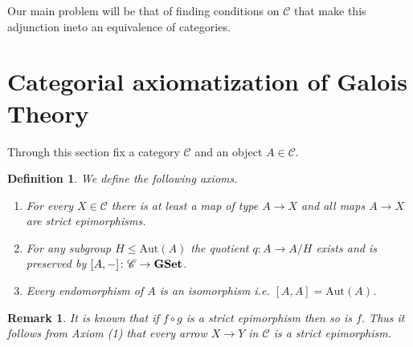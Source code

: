 \documentclass[italian, 12pt, reqno]{article}
\theoremstyle{myteo}
\newtheorem{definition}[theorem]{Definition}
\newtheorem{remark}[theorem]{Remark}
\numberwithin{equation}{section}
\newcommand{\cat}[1]{\mathscr{#1}}
\newcommand{\aut}{\text{Aut}}
\newcommand{\gset}{\text{\textbf{GSet}}}
\newcommand{\homs}[2]{[#1, #2]}
\newcommand{\fun}[3]{#1\colon#2\to #3}
\begin{document}
\begin{figure}[h]
  \begin{center}
    \hspace{2cm}
  \end{center}
  \caption{}
  \label{diagram:bijection}
\end{figure}

Our main problem will be that of finding conditions on \(\cat{C}\) that make this adjunction ineto an equivalence of categories.

\section{Categorial axiomatization of Galois Theory}
\label{sec:axioms}

Through this section fix a category \(\cat{C}\) and an object \(A\in\cat{C}\).

\begin{definition}
  \label{def:axioms}
  We define the following axioms.
  \begin{enumerate}
  \item For every \(X\in\cat{C}\) there is at least a map of type \(A\to X\) and all maps \(A\to X\) are strict epimorphisms.
  \item For any subgroup \(H\leq \aut(A)\) the quotient \(\fun{q}{A}{A/H}\) exists and is preserved by \(\fun{\homs{A}{-}}{\cat{C}}{\gset}\).
  \item Every endomorphism of \(A\) is an isomorphism i.e. \(\homs{A}{A} = \aut(A)\).
  \end{enumerate}
\end{definition}

\begin{remark}
  \label{rem:all_strict_epi}
  It is known that if \(f\circ g\) is a strict epimorphism then so is \(f\).
  Thus it follows from Axiom (1) that every arrow \(X\to Y\) in \(\cat{C}\) is a strict epimorphism.
\end{remark}
\end{document}
